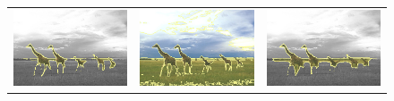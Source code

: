 \documentclass[smallextended]{svjour3}       %
\begin{document}
{{\begin{figure}[hp!]
\begin{tabular}{ccc}
		\includegraphics[scale=0.2]{images/segmentation/bc/giraffes/gc-seg.png} &
		\includegraphics[scale=0.2]{images/segmentation/schoenemann/giraffes/giraffes-seg.png} &
		\includegraphics[scale=0.2]{images/segmentation/bc/giraffes/corrected-seg.png} \\		

\end{tabular}
\end{figure}}}
\end{document}
